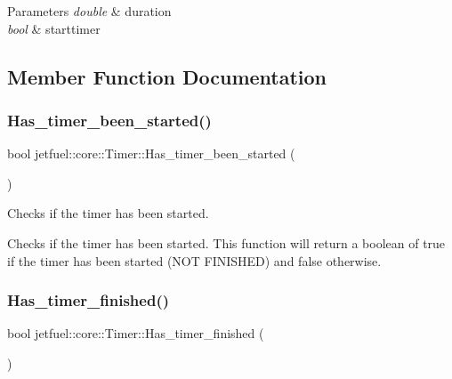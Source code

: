 \begin{DoxyParams}{Parameters}
{\em double} & duration \\
\hline
{\em bool} & starttimer \\
\hline
\end{DoxyParams}


\subsection{Member Function Documentation}
\mbox{\label{classjetfuel_1_1core_1_1Timer_a6442806833e30cc94d6c17dd91243c57}} 
\subsubsection{\texorpdfstring{Has\+\_\+timer\+\_\+been\+\_\+started()}{Has\_timer\_been\_started()}}
{\footnotesize\ttfamily bool jetfuel\+::core\+::\+Timer\+::\+Has\+\_\+timer\+\_\+been\+\_\+started (\begin{DoxyParamCaption}{ }\end{DoxyParamCaption})\hspace{0.3cm}{\ttfamily [inline]}}



Checks if the timer has been started. 

Checks if the timer has been started. This function will return a boolean of true if the timer has been started (N\+OT F\+I\+N\+I\+S\+H\+ED) and false otherwise. \mbox{\label{classjetfuel_1_1core_1_1Timer_a8d6efef6a9e6aae8156fd1f8dce5f403}} 
\subsubsection{\texorpdfstring{Has\+\_\+timer\+\_\+finished()}{Has\_timer\_finished()}}
{\footnotesize\ttfamily bool jetfuel\+::core\+::\+Timer\+::\+Has\+\_\+timer\+\_\+finished (\begin{DoxyParamCaption}{ }\end{DoxyParamCaption})\hspace{0.3cm}{\ttfamily [inline]}}



